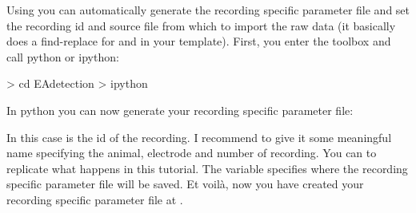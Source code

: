 \documentclass[letterpaper,10pt,english]{sphinxmanual}
\begin{document}
%
\begin{sphinxVerbatim}[commandchars=\\\{\}]
  
\end{sphinxVerbatim}

Using  you can automatically generate the recording specific parameter file and
set the recording id and source file from which to import the raw data (it basically does a find-replace for
 and  in your template).
First, you enter the toolbox and call python or ipython:

\textgreater{} cd EAdetection
\textgreater{} ipython

In python you can now generate your recording specific parameter file:

%
\begin{sphinxVerbatim}[commandchars=\\\{\}]
   
  
   
  
  
 
 
\end{sphinxVerbatim}

In this case  is the id of the recording. I recommend to give it some meaningful name specifying the animal, electrode
and number of recording. You can  to replicate what happens
in this tutorial.
The variable  specifies where the recording specific parameter file will be saved.
Et voilà, now you have created your recording specific parameter file at .
\end{document}
